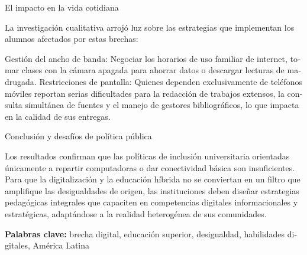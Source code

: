 \documentclass{article}
\begin{document}
\begin{tcolorbox}[colback=brown!8!white,colframe=brown!8!white,boxrule=0pt,arc=2pt,left=4pt,right=4pt,top=3pt,bottom=3pt,before skip=4pt,after skip=4pt]
\begin{otherlanguage}{spanish}
El impacto en la vida cotidiana

La investigación cualitativa arrojó luz sobre las estrategias que implementan los alumnos afectados por estas brechas:

Gestión del ancho de banda: Negociar los horarios de uso familiar de internet, tomar clases con la cámara apagada para ahorrar datos o descargar lecturas de madrugada.
Restricciones de pantalla: Quienes dependen exclusivamente de teléfonos móviles reportan serias dificultades para la redacción de trabajos extensos, la consulta simultánea de fuentes y el manejo de gestores bibliográficos, lo que impacta en la calidad de sus entregas.

Conclusión y desafíos de política pública

Los resultados confirman que las políticas de inclusión universitaria orientadas únicamente a repartir computadoras o dar conectividad básica son insuficientes. Para que la digitalización y la educación híbrida no se conviertan en un filtro que amplifique las desigualdades de origen, las instituciones deben diseñar estrategias pedagógicas integrales que capaciten en competencias digitales informacionales y estratégicas, adaptándose a la realidad heterogénea de sus comunidades.
\par\smallskip\noindent\textbf{Palabras clave:} brecha digital, educación superior, desigualdad, habilidades digitales, América Latina
\end{otherlanguage}
\end{tcolorbox}
\end{document}
